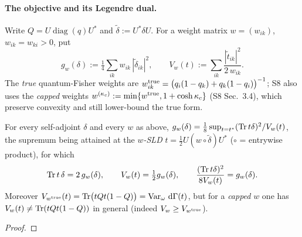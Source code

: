 \documentclass[11pt]{article}
\DeclareMathOperator{\Var}{Var}
\DeclareMathOperator{\diag}{diag}
\begin{document}
\paragraph{The objective and its Legendre dual.}  Write $Q=U\diag(q)U^*$ and
$\widetilde\delta:=U^*\delta U$.  For a weight matrix $w=(w_{ik})$, $w_{ik}=w_{ki}>0$, put
\begin{equation}\label{eq:gw}
 g_w(\delta):=\tfrac14\sum_{ik}w_{ik}\,|\widetilde\delta_{ik}|^2,
 \qquad
 V_w(t):=\sum_{ik}\frac{|\widetilde t_{ik}|^2}{2\,w_{ik}} .
\end{equation}
The \emph{true} quantum-Fisher weights are $w^{\rm true}_{ik}=\bigl(q_i(1-q_k)+q_k(1-q_i)\bigr)^{-1}$;
S8 also uses the \emph{capped} weights $w^{(\kappa_c)}:=\min\{w^{\rm true},1+\cosh\kappa_c\}$
(S8 Sec.~3.4), which preserve convexity and still lower-bound the true form.

\begin{lemma}\label{lem:legendre}
For every self-adjoint $\delta$ and every $w$ as above,
$g_w(\delta)=\tfrac18\sup_{t=t^*}(\operatorname{Tr} t\delta)^2/V_w(t)$, the supremum being attained at the
\emph{$w$-SLD} $t=\tfrac12U(w\circ\widetilde\delta)U^*$ ($\circ$ = entrywise product), for which
\begin{equation}\label{eq:sldid}
 \operatorname{Tr} t\,\delta=2\,g_w(\delta),\qquad V_w(t)=\tfrac12 g_w(\delta),\qquad
 \frac{(\operatorname{Tr} t\delta)^2}{8V_w(t)}=g_w(\delta).
\end{equation}
Moreover $V_{w^{\rm true}}(t)=\Tr\bigl(tQt(1-Q)\bigr)=\Var_\omega\dd\Gamma(t)$, but for a
\emph{capped} $w$ one has $V_w(t)\ne\operatorname{Tr}(tQt(1-Q))$ in general (indeed $V_w\ge V_{w^{\rm true}}$).
\end{lemma}

\begin{proof}
\end{proof}
\end{document}
